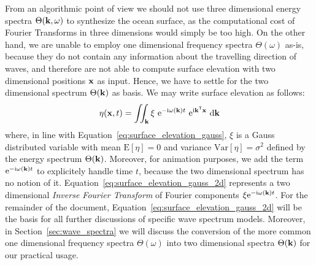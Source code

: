 From an algorithmic point of view we should not use three dimensional
energy spectra $\Theta(\mathbf{k},\omega)$ to synthesize the ocean surface, as
the computational cost of Fourier Transforms in three dimensions would simply
be too high.
On the other hand, we are unable to employ one dimensional frequency spectra
$\Theta(\omega)$ as-is, because they do not contain any information about
the  travelling direction of waves, and therefore are not able to compute 
surface elevation with two dimensional positions $\mathbf{x}$ as input.
Hence, we have to settle for the two dimensional \wavenumber spectrum
$\Theta(\mathbf{k})$ as basis. We may write surface elevation as follows:
\begin{equation}
\label{eq:surface_elevation_gauss_2d}
 \eta(\mathbf{x}, t) = \iint_{\mathbf{k}} 
\xi~\mathrm{e}^{-\mathrm{i}\omega(\mathbf{k}) t}
~\mathrm{e}^{\mathrm{i}\mathbf{k}^{\mathsf{T}}\mathbf{x}}~\mathrm{d}\mathbf{k}
\end{equation}
where, in line with Equation~\ref{eq:surface_elevation_gauss}, $\xi$ is 
a Gauss distributed variable with mean $\mathrm{E}[\eta] = 0$ and
variance $\mathrm{Var}[\eta] = \sigma^2$ defined by the energy spectrum
$\Theta(\mathbf{k})$. Moreover, for animation purposes, we add the term 
$\mathrm{e}^{-\mathrm{i}\omega(\mathbf{k}) t}$ to explicitely handle 
time $t$, because the two dimensional \wavenumber spectrum has no notion of 
it. Equation~\ref{eq:surface_elevation_gauss_2d} represents a two dimensional 
\emph{Inverse Fourier Transform} of Fourier components 
$\xi\mathrm{e}^{-\mathrm{i}\omega(\mathbf{k}) t}$. For the remainder of the 
document, Equation~\ref{eq:surface_elevation_gauss_2d} will be the basis for all 
further discussions of specific wave spectrum models. Moreover, in 
Section~\ref{sec:wave_spectra} we will discuss the conversion of the 
more common one dimensional frequency spectra $\Theta(\omega)$ into two 
dimensional \wavenumber spectra $\Theta(\mathbf{k})$ for our practical usage.
%
